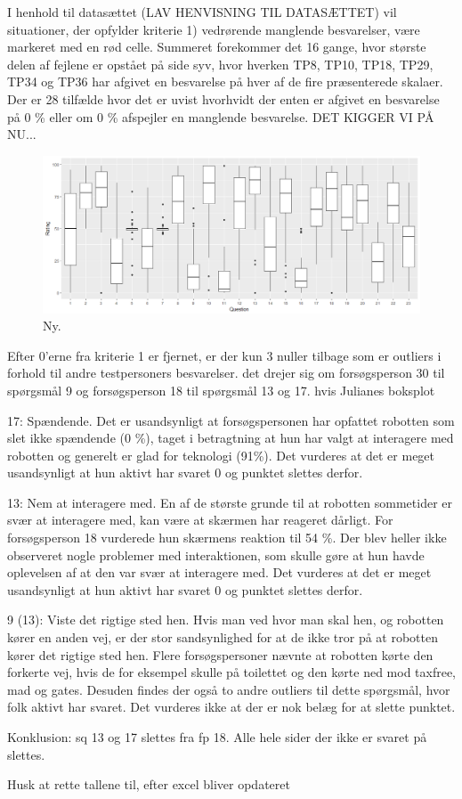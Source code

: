 I henhold til datasættet (LAV HENVISNING TIL DATASÆTTET) vil situationer, der opfylder kriterie 1) vedrørende manglende besvarelser, være markeret med en rød celle. Summeret forekommer det 16 gange, hvor største delen af fejlene er opstået på side syv, hvor hverken TP8, TP10, TP18, TP29, TP34 og TP36 har afgivet en besvarelse på hver af de fire præsenterede skalaer. \blankline
%
Der er 28 tilfælde hvor det er uvist hvorhvidt der enten er afgivet en besvarelse på 0 \% eller om 0 \% afspejler en manglende besvarelse. DET KIGGER VI PÅ NU... 
%
\begin{figure}[H]
\centering
\includegraphics[width = \textwidth]{Figure/DatabehandlingSkalaer/Boksplot} 
\caption{Ny.}
\label{fig:Boxplot0er}
\end{figure}
\noindent
%

Efter 0'erne fra kriterie 1 er fjernet, er der kun 3 nuller tilbage som er outliers i forhold til andre testpersoners besvarelser. det drejer sig om forsøgsperson 30 til spørgsmål 9 og forsøgsperson 18 til spørgsmål 13 og 17. 
hvis Julianes boksplot

17: Spændende. Det er usandsynligt at forsøgspersonen har opfattet robotten som slet ikke spændende (0 \%), taget i betragtning at hun har valgt at interagere med robotten og generelt er glad for teknologi (91\%). Det vurderes at det er meget usandsynligt at hun aktivt har svaret 0 og punktet slettes derfor.

13: Nem at interagere med. En af de største grunde til at robotten sommetider er svær at interagere med, kan være at skærmen har reageret dårligt. For forsøgsperson 18 vurderede hun skærmens reaktion til 54 \%. Der blev heller ikke observeret nogle problemer med interaktionen, som skulle gøre at hun havde oplevelsen af at den var svær at interagere med. Det vurderes at det er meget usandsynligt at hun aktivt har svaret 0 og punktet slettes derfor.

9 (13): Viste det rigtige sted hen. Hvis man ved hvor man skal hen, og robotten kører en anden vej, er der stor sandsynlighed for at de ikke tror på at robotten kører det rigtige sted hen. Flere forsøgspersoner nævnte at robotten kørte den forkerte vej, hvis de for eksempel skulle på toilettet og den kørte ned mod taxfree, mad og gates. Desuden findes der også to andre outliers til dette spørgsmål, hvor folk aktivt har svaret. Det vurderes ikke at der er nok belæg for at slette punktet.

Konklusion: sq 13 og 17 slettes fra fp 18. Alle hele sider der ikke er svaret på slettes. 

Husk at rette tallene til, efter excel bliver opdateret
